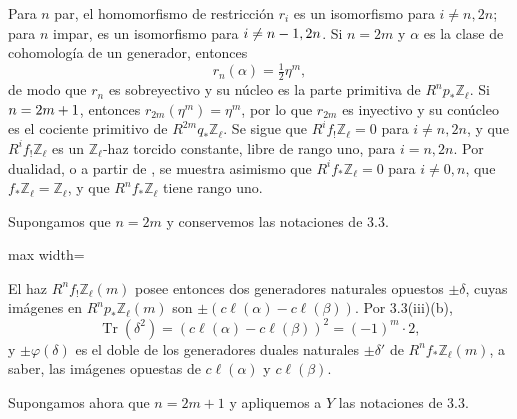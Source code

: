 Para $n$ par, el homomorfismo de restricción $r_i$ es un isomorfismo para
$i\neq n,2n$; para $n$ impar, es un isomorfismo para $i\neq \sisi{n-1}{n-1,2n}$. Si
$n=2m$ y $\alpha$ es la clase de cohomología de un generador, entonces
\begin{equation*}
r_n(\alpha)=\tfrac12\eta^m,
\end{equation*}
de modo que $r_n$ es sobreyectivo y su núcleo es la parte primitiva de
$R^np_*\mathbb Z_\ell$. Si $\sisi{r}{n}=2m+1$, entonces
$r_{2m}(\eta^m)=\eta^m$, por lo que $r_{2m}$ es inyectivo y su conúcleo es
el cociente primitivo de $R^{2m}q_*\mathbb Z_\ell$. Se sigue que
$R^if_!\mathbb Z_\ell=0$ para $i\neq n,2n$, y que
$R^if_!\mathbb Z_\ell$ es un $\mathbb Z_\ell$-haz torcido constante,
libre de rango uno, para $i=n,2n$. Por dualidad, o a partir de
, se muestra asimismo que
$R^if_*\mathbb Z_\ell=0$ para $i\neq0,n$, que
$f_*\mathbb Z_\ell=\mathbb Z_\ell$, y que
$R^nf_*\mathbb Z_\ell$ tiene rango uno.


Supongamos que $n=2m$ y conservemos las notaciones de 3.3.

\pageoriginale

\begin{center}
\small
\begin{adjustbox}{max width=\linewidth}\end{adjustbox}
\end{center}

El haz $R^nf_!\mathbb Z_\ell(m)$ posee entonces dos generadores naturales
opuestos $\pm\delta$, cuyas imágenes en
$R^np_*\mathbb Z_\ell(m)$ son
$\pm(c\ell(\alpha)-c\ell(\beta))$. Por 3.3(iii)(b),
\begin{equation*}
\operatorname{Tr}(\delta^2)
=(c\ell(\alpha)-c\ell(\beta))^2=(-1)^m\cdot2,
\end{equation*}
y $\pm\varphi(\delta)$ es el doble de los generadores duales naturales
$\pm\delta'$ de $R^nf_*\mathbb Z_\ell(m)$, a saber, las imágenes opuestas
de $c\ell(\alpha)$ y $c\ell(\beta)$.

Supongamos ahora que $n=2m+1$ y apliquemos a $Y$ las notaciones de 3.3.

